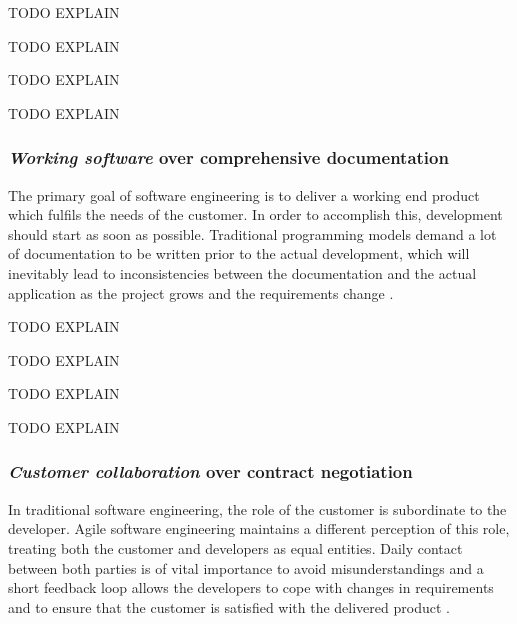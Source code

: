 

TODO EXPLAIN

TODO EXPLAIN

TODO EXPLAIN

TODO EXPLAIN

\subsubsection{\emph{Working software} over comprehensive documentation}
The primary goal of software engineering is to deliver a working end product which fulfils the needs of the customer. In order to accomplish this, development should start as soon as possible. Traditional programming models demand a lot of documentation to be written prior to the actual development, which will inevitably lead to inconsistencies between the documentation and the actual application as the project grows and the requirements change \cite{Hazzan2014}. 
	
TODO EXPLAIN

TODO EXPLAIN

TODO EXPLAIN

TODO EXPLAIN

\subsubsection{\emph{Customer collaboration} over contract negotiation}
In traditional software engineering, the role of the customer is subordinate to the developer. Agile software engineering maintains a different perception of this role, treating both the customer and developers as equal entities. Daily contact between both parties is of vital importance to avoid misunderstandings and a short feedback loop allows the developers to cope with changes in requirements and to ensure that the customer is satisfied with the delivered product \cite{Hazzan2014}.

